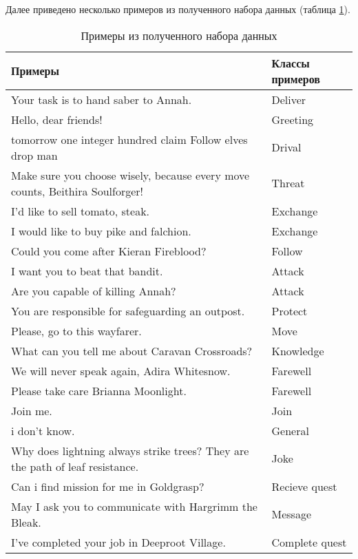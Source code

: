 Далее приведено несколько примеров из полученного набора данных (таблица \ref{examples:table}).
\begin{table}[H]
   \captionsetup{format=hang, singlelinecheck=false}
   \raggedleft
      \caption{Примеры из полученного набора данных}
      \label{examples:table}
   \centering        
   \begin{tabular}{|p{11cm}|p{5cm}|}
      \hline
      Примеры & Классы примеров \\
      \hline
      Your task is to hand saber to Annah. & Deliver \\
      \hline
      Hello, dear friends! & Greeting \\
      \hline
      tomorrow one integer hundred claim Follow elves drop man & Drival \\
      \hline
      Make sure you choose wisely, because every move counts, Beithira Soulforger! & Threat \\
      \hline
      I'd like to sell tomato, steak. & Exchange \\
      \hline
      I would like to buy pike and falchion. & Exchange \\
      \hline
      Could you come after Kieran Fireblood? & Follow \\
      \hline
      I want you to beat that bandit. & Attack \\
      \hline
      Are you capable of killing Annah? & Attack \\
      \hline
      You are responsible for safeguarding an outpost. & Protect \\
      \hline
      Please, go to this wayfarer. & Move \\
      \hline
      What can you tell me about Caravan Crossroads? & Knowledge \\
      \hline
      We will never speak again, Adira Whitesnow. & Farewell \\
      \hline
      Please take care Brianna Moonlight. & Farewell \\
      \hline
      Join me. & Join \\
      \hline
      i don't know. & General \\
      \hline
      Why does lightning always strike trees? They are the path of leaf resistance. & Joke \\
      \hline
      Can i find mission for me in Goldgrasp? & Recieve quest \\
      \hline
      May I ask you to communicate with Hargrimm the Bleak. & Message \\
      \hline
      I've completed your job in Deeproot Village. & Complete quest \\
      \hline
   \end{tabular}
\end{table}